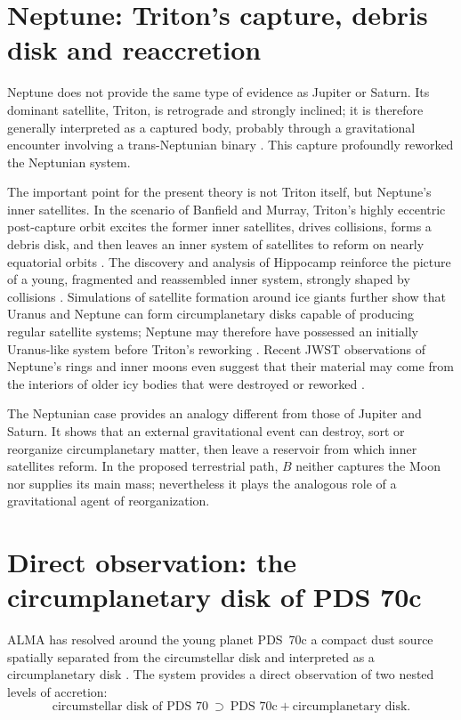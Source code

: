 \documentclass[11pt,a4paper,openany]{report}
\begin{document}
\section{Neptune: Triton's capture, debris disk and reaccretion}

Neptune does not provide the same type of evidence as Jupiter or Saturn. Its dominant satellite,
Triton, is retrograde and strongly inclined; it is therefore generally interpreted as a captured
body, probably through a gravitational encounter involving a trans-Neptunian binary
\cite{AgnorHamilton2006}. This capture profoundly reworked the Neptunian system.

The important point for the present theory is not Triton itself, but Neptune's inner satellites.
In the scenario of Banfield and Murray, Triton's highly eccentric post-capture orbit excites the
former inner satellites, drives collisions, forms a debris disk, and then leaves an inner system of
satellites to reform on nearly equatorial orbits \cite{BanfieldMurray1992}. The discovery and
analysis of Hippocamp reinforce the picture of a young, fragmented and reassembled inner system,
strongly shaped by collisions \cite{Showalter2019}. Simulations of satellite formation around ice
giants further show that Uranus and Neptune can form circumplanetary disks capable of producing
regular satellite systems; Neptune may therefore have possessed an initially Uranus-like system
before Triton's reworking \cite{Szulagyi2018}. Recent JWST observations of Neptune's rings and
inner moons even suggest that their material may come from the interiors of older icy bodies that
were destroyed or reworked \cite{Davis2026}.

\begin{ideephys}
The Neptunian case provides an analogy different from those of Jupiter and Saturn. It shows that
an external gravitational event can destroy, sort or reorganize circumplanetary matter, then leave
a reservoir from which inner satellites reform. In the proposed terrestrial path, $B$ neither
captures the Moon nor supplies its main mass; nevertheless it plays the analogous role of a
gravitational agent of reorganization.
\end{ideephys}

\section{Direct observation: the circumplanetary disk of PDS 70c}

ALMA has resolved around the young planet PDS~70c a compact dust source spatially separated from
the circumstellar disk and interpreted as a circumplanetary disk \cite{Benisty2021}. The system
provides a direct observation of two nested levels of accretion:
\begin{equation}
\text{circumstellar disk of PDS~70}\ \supset\ \text{PDS~70c}+\text{circumplanetary disk}.
\label{eq:pds70}
\end{equation}
\end{document}
